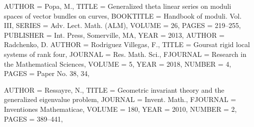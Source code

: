 \begin{bibdiv}
\begin{biblist}
 {
    AUTHOR = {Popa, M.},
     TITLE = {Generalized theta linear series on moduli spaces of vector
              bundles on curves},
 BOOKTITLE = {Handbook of moduli. {V}ol. {III}},
    SERIES = {Adv. Lect. Math. (ALM)},
    VOLUME = {26},
     PAGES = {219--255},
 PUBLISHER = {Int. Press, Somerville, MA},
      YEAR = {2013},
}
 {
    AUTHOR = {Radchenko, D.}
    AUTHOR = {Rodriguez Villegas, F.},
     TITLE = {Goursat rigid local systems of rank four},
   JOURNAL = {Res. Math. Sci.},
  FJOURNAL = {Research in the Mathematical Sciences},
    VOLUME = {5},
      YEAR = {2018},
    NUMBER = {4},
     PAGES = {Paper No. 38, 34},
}

 {
    AUTHOR = {Ressayre, N.},
     TITLE = {Geometric invariant theory and the generalized eigenvalue
              problem},
   JOURNAL = {Invent. Math.},
  FJOURNAL = {Inventiones Mathematicae},
    VOLUME = {180},
      YEAR = {2010},
    NUMBER = {2},
     PAGES = {389--441},
}






\end{biblist}
\end{bibdiv}
